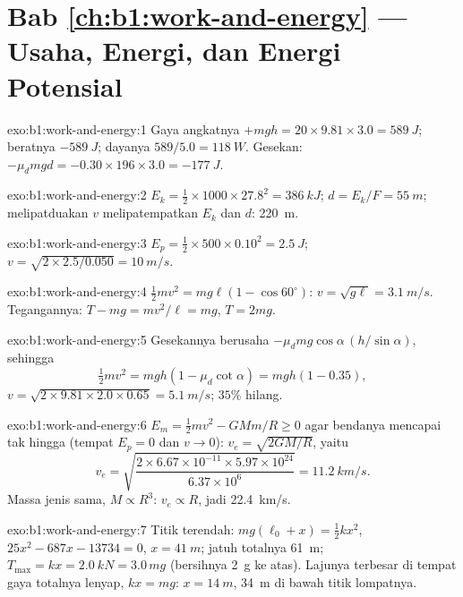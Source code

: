 \section*{Bab \ref{ch:b1:work-and-energy} --- Usaha, Energi, dan Energi Potensial}

\begin{solution}{exo:b1:work-and-energy:1}
Gaya angkatnya $+mgh = 20 \times 9.81 \times 3.0 = \qty{589}{J}$; beratnya
$-\qty{589}{J}$; dayanya $589/5.0 = \qty{118}{W}$. Gesekan: $-\mu_dmgd =
-0.30 \times 196 \times 3.0 = \qty{-177}{J}$.
\end{solution}

\begin{solution}{exo:b1:work-and-energy:2}
$E_k = \tfrac12 \times 1000 \times 27.8^2 = \qty{386}{kJ}$; $d = E_k/F =
\qty{55}{m}$; melipatduakan $v$ melipatempatkan $E_k$ dan $d$: \qty{220}{m}.
\end{solution}

\begin{solution}{exo:b1:work-and-energy:3}
$E_p = \tfrac12 \times 500 \times 0.10^2 = \qty{2.5}{J}$; $v = \sqrt{2 \times
2.5/0.050} = \qty{10}{m/s}$.
\end{solution}

\begin{solution}{exo:b1:work-and-energy:4}
$\tfrac12 mv^2 = mg\ell(1 - \cos 60^\circ)$: $v = \sqrt{g\ell} = \qty{3.1}{m/s}$.
Tegangannya: $T - mg = mv^2/\ell = mg$, $T = 2mg$.
\end{solution}

\begin{solution}{exo:b1:work-and-energy:5}
Gesekannya berusaha $-\mu_dmg\cos\alpha\,(h/\sin\alpha)$, sehingga
\[
\tfrac12 mv^2 = mgh(1 - \mu_d\cot\alpha) = mgh(1 - 0.35),
\]
$v = \sqrt{2 \times 9.81 \times 2.0 \times 0.65} = \qty{5.1}{m/s}$; $35\%$ hilang.
\end{solution}

\begin{solution}{exo:b1:work-and-energy:6}
$E_m = \tfrac12 mv^2 - GMm/R \geq 0$ agar bendanya mencapai tak hingga
(tempat $E_p = 0$ dan $v \to 0$): $v_e = \sqrt{2GM/R}$, yaitu
\[
v_e = \sqrt{\frac{2 \times 6.67\times10^{-11} \times 5.97\times10^{24}}{6.37\times10^6}}
= \qty{11.2}{km/s}.
\]
Massa jenis sama, $M \propto R^3$: $v_e \propto R$, jadi \qty{22.4}{km/s}.
\end{solution}

\begin{solution}{exo:b1:work-and-energy:7}
Titik terendah: $mg(\ell_0 + x) = \tfrac12 kx^2$, $25x^2 - 687x - 13734 = 0$,
$x = \qty{41}{m}$; jatuh totalnya \qty{61}{m}; $T_{\max} = kx = \qty{2.0}{kN}
= 3.0\,mg$ (bersihnya \qty{2}{g} ke atas). Lajunya terbesar di tempat gaya
totalnya lenyap, $kx = mg$: $x = \qty{14}{m}$, \qty{34}{m} di bawah titik lompatnya.
\end{solution}

